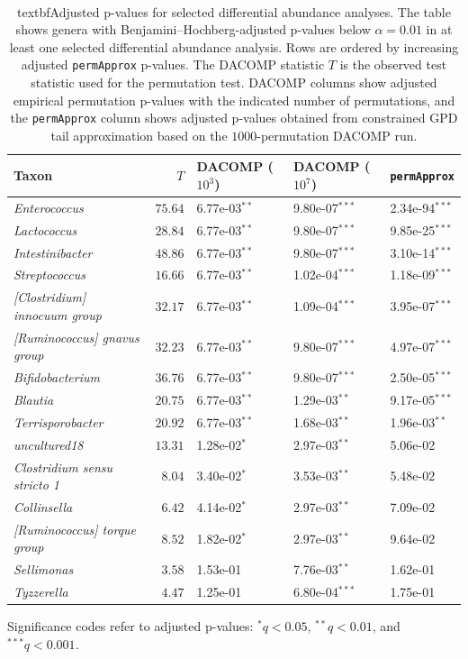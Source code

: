 \begin{table}[H]
\centering
\caption{textbf{Adjusted p-values for selected differential abundance analyses.} The table shows genera with Benjamini--Hochberg-adjusted p-values below $\alpha=0.01$ in at least one selected differential abundance analysis. Rows are ordered by increasing adjusted \texttt{permApprox} p-values. The DACOMP statistic $T$ is the observed test statistic used for the permutation test. DACOMP columns show adjusted empirical permutation p-values with the indicated number of permutations, and the \texttt{permApprox} column shows adjusted p-values obtained from constrained GPD tail approximation based on the $1000$-permutation DACOMP run.}
\label{tab:app:7app:diff_abundance_adj_pvalues}\
\vspace{0.5em}
\small
\begin{tabular}{lrlll}
\toprule
Taxon & $T$ & DACOMP ($10^3$) & DACOMP ($10^7$) & \texttt{permApprox} \\
\midrule
\emph{Enterococcus} & $75.64$ & 6.77e-03$^{**}$ & 9.80e-07$^{***}$ & 2.34e-94$^{***}$ \\
\emph{Lactococcus} & $28.84$ & 6.77e-03$^{**}$ & 9.80e-07$^{***}$ & 9.85e-25$^{***}$ \\
\emph{Intestinibacter} & $48.86$ & 6.77e-03$^{**}$ & 9.80e-07$^{***}$ & 3.10e-14$^{***}$ \\
\emph{Streptococcus} & $16.66$ & 6.77e-03$^{**}$ & 1.02e-04$^{***}$ & 1.18e-09$^{***}$ \\
\emph{[Clostridium] innocuum group} & $32.17$ & 6.77e-03$^{**}$ & 1.09e-04$^{***}$ & 3.95e-07$^{***}$ \\
\emph{[Ruminococcus] gnavus group} & $32.23$ & 6.77e-03$^{**}$ & 9.80e-07$^{***}$ & 4.97e-07$^{***}$ \\
\emph{Bifidobacterium} & $36.76$ & 6.77e-03$^{**}$ & 9.80e-07$^{***}$ & 2.50e-05$^{***}$ \\
\emph{Blautia} & $20.75$ & 6.77e-03$^{**}$ & 1.29e-03$^{**}$ & 9.17e-05$^{***}$ \\
\emph{Terrisporobacter} & $20.92$ & 6.77e-03$^{**}$ & 1.68e-03$^{**}$ & 1.96e-03$^{**}$ \\
\addlinespace
\emph{uncultured18} & $13.31$ & 1.28e-02$^{*}$ & 2.97e-03$^{**}$ & 5.06e-02 \\
\emph{Clostridium sensu stricto 1} & $8.04$ & 3.40e-02$^{*}$ & 3.53e-03$^{**}$ & 5.48e-02 \\
\emph{Collinsella} & $6.42$ & 4.14e-02$^{*}$ & 2.97e-03$^{**}$ & 7.09e-02 \\
\emph{[Ruminococcus] torque group} & $8.52$ & 1.82e-02$^{*}$ & 2.97e-03$^{**}$ & 9.64e-02 \\
\emph{Sellimonas} & $3.58$ & 1.53e-01 & 7.76e-03$^{**}$ & 1.62e-01 \\
\emph{Tyzzerella} & $4.47$ & 1.25e-01 & 6.80e-04$^{***}$ & 1.75e-01 \\
\bottomrule
\end{tabular}

\begin{minipage}{0.98\textwidth}
\small
Significance codes refer to adjusted p-values: $^{*} q < 0.05$, $^{**} q < 0.01$, and $^{***} q < 0.001$.
\end{minipage}
\end{table}

